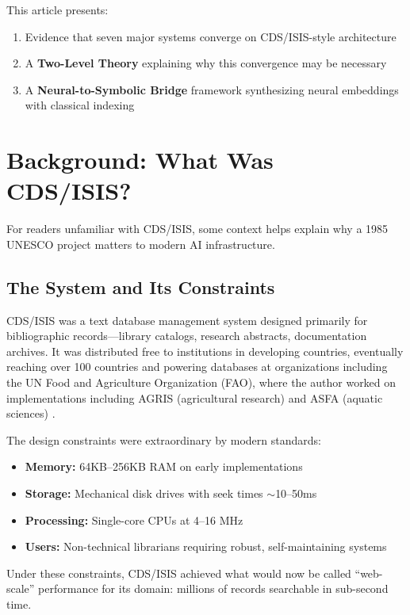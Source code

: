 \documentclass[manuscript,screen,nonacm]{acmart}
\begin{document}
This article presents:
\begin{enumerate}
    \item Evidence that seven major systems converge on CDS/ISIS-style architecture
    \item A \textbf{Two-Level Theory} explaining why this convergence may be necessary
    \item A \textbf{Neural-to-Symbolic Bridge} framework synthesizing neural embeddings with classical indexing
\end{enumerate}

\section{Background: What Was CDS/ISIS?}

For readers unfamiliar with CDS/ISIS, some context helps explain why a 1985 UNESCO project matters to modern AI infrastructure.

\subsection{The System and Its Constraints}

CDS/ISIS was a text database management system designed primarily for bibliographic records---library catalogs, research abstracts, documentation archives. It was distributed free to institutions in developing countries, eventually reaching over 100 countries and powering databases at organizations including the UN Food and Agriculture Organization (FAO), where the author worked on implementations including AGRIS (agricultural research) and ASFA (aquatic sciences) \cite{fao2005}.

The design constraints were extraordinary by modern standards:
\begin{itemize}
    \item \textbf{Memory:} 64KB--256KB RAM on early implementations
    \item \textbf{Storage:} Mechanical disk drives with seek times $\sim$10--50ms
    \item \textbf{Processing:} Single-core CPUs at 4--16 MHz
    \item \textbf{Users:} Non-technical librarians requiring robust, self-maintaining systems
\end{itemize}

Under these constraints, CDS/ISIS achieved what would now be called ``web-scale'' performance for its domain: millions of records searchable in sub-second time.
\end{document}
